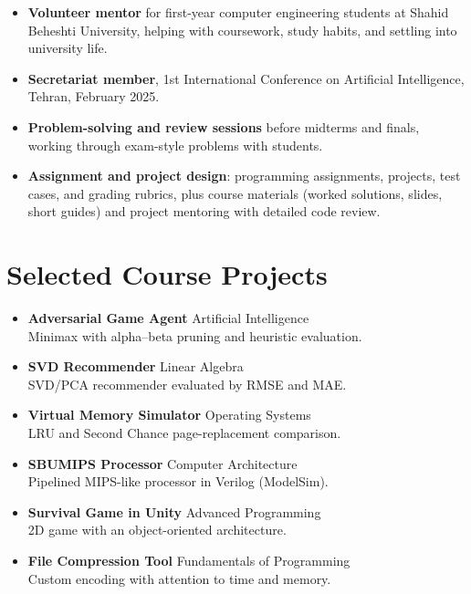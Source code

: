 \documentclass[11pt,a4paper]{article}
\newcommand{\subheader}[1]{%
  \vspace{0.35em}{\bfseries\normalsize #1}\par\vspace{0.2em}%
}
\begin{document}
\vspace{0.45em}
\subheader{Service}
\begin{itemize}[itemsep=0.5em,topsep=0.3em]
  \item \textbf{Volunteer mentor} for first-year computer engineering students at Shahid Beheshti University, helping with coursework, study habits, and settling into university life.
  \item \textbf{Secretariat member}, 1st International Conference on Artificial Intelligence, Tehran, February 2025.
  \item \textbf{Problem-solving and review sessions} before midterms and finals, working through exam-style problems with students.
  \item \textbf{Assignment and project design}: programming assignments, projects, test cases, and grading rubrics, plus course materials (worked solutions, slides, short guides) and project mentoring with detailed code review.
\end{itemize}
\vspace{0.25em}

\section*{Selected Course Projects}

\begin{itemize}
  \item \textbf{Adversarial Game Agent} \hfill {\small\color{muted}Artificial Intelligence}\\[-0.05em]
        {\small Minimax with alpha--beta pruning and heuristic evaluation.}
  \item \textbf{SVD Recommender} \hfill {\small\color{muted}Linear Algebra}\\[-0.05em]
        {\small SVD/PCA recommender evaluated by RMSE and MAE.}
  \item \textbf{Virtual Memory Simulator} \hfill {\small\color{muted}Operating Systems}\\[-0.05em]
        {\small LRU and Second Chance page-replacement comparison.}
  \item \textbf{SBUMIPS Processor} \hfill {\small\color{muted}Computer Architecture}\\[-0.05em]
        {\small Pipelined MIPS-like processor in Verilog (ModelSim).}
  \item \textbf{Survival Game in Unity} \hfill {\small\color{muted}Advanced Programming}\\[-0.05em]
        {\small 2D game with an object-oriented architecture.}
  \item \textbf{File Compression Tool} \hfill {\small\color{muted}Fundamentals of Programming}\\[-0.05em]
        {\small Custom encoding with attention to time and memory.}
\end{itemize}
\end{document}
